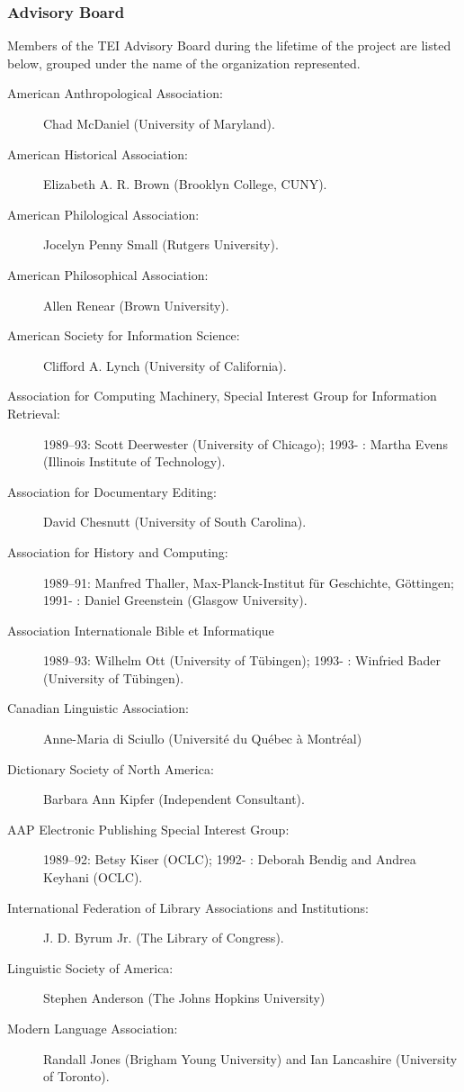 \subsubsection[{Advisory Board}]{Advisory Board}\label{WGAB}\par
Members of the TEI Advisory Board during the lifetime of the project are listed below, grouped under the name of the organization represented. \begin{description}

\item[{American Anthropological Association:}]Chad McDaniel (University of Maryland).
\item[{American Historical Association:}]Elizabeth A. R. Brown (Brooklyn College, CUNY).
\item[{American Philological Association:}]Jocelyn Penny Small (Rutgers University).
\item[{American Philosophical Association:}]Allen Renear (Brown University).
\item[{American Society for Information Science:}]Clifford A. Lynch (University of California).
\item[{Association for Computing Machinery, Special Interest Group for Information Retrieval:}]1989–93: Scott Deerwester (University of Chicago); 1993- : Martha Evens (Illinois Institute of Technology).
\item[{Association for Documentary Editing:}]David Chesnutt (University of South Carolina).
\item[{Association for History and Computing:}]1989–91: Manfred Thaller, Max-Planck-Institut für Geschichte, Göttingen; 1991- : Daniel Greenstein (Glasgow University).
\item[{Association Internationale Bible et Informatique}]1989–93: Wilhelm Ott (University of Tübingen); 1993- : Winfried Bader (University of Tübingen).
\item[{Canadian Linguistic Association:}]Anne-Maria di Sciullo (Université du Québec à Montréal)
\item[{Dictionary Society of North America:}]Barbara Ann Kipfer (Independent Consultant).
\item[{AAP Electronic Publishing Special Interest Group:}]1989–92: Betsy Kiser (OCLC); 1992- : Deborah Bendig and Andrea Keyhani (OCLC).
\item[{International Federation of Library Associations and Institutions:}]J. D. Byrum Jr. (The Library of Congress).
\item[{Linguistic Society of America:}]Stephen Anderson (The Johns Hopkins University)
\item[{Modern Language Association:}]Randall Jones (Brigham Young University) and Ian Lancashire (University of Toronto).
\end{description} 
